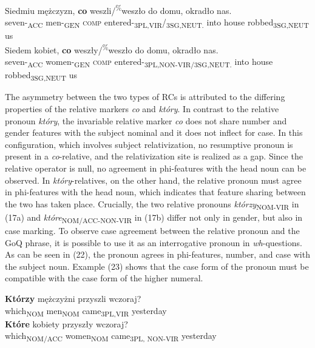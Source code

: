 \documentclass[output=paper]{langsci/langscibook}
\begin{document}
\ea%
    \label{ex:leska:21}
    \ea
    \gll Siedmiu   mężczyzn,   \textbf{co}   weszli/\textsuperscript{\%}weszło     do domu, okradło     nas.\\
         seven-\textsubscript{ACC}   men-\textsubscript{GEN}   \textsc{comp}   entered-\textsubscript{3PL,VIR}/\textsubscript{3SG,NEUT.} into         house   robbed\textsubscript{3SG,NEUT} us\\
    \ex
    \gll Siedem   kobiet,   \textbf{co}   weszły/\textsuperscript{\%}weszło   \textsubscript{} do   domu,   okradło     nas.      \\
         seven-\textsubscript{ACC}   women-\textsubscript{GEN}   \textsc{comp}   entered-\textsubscript{3PL,NON-VIR/3SG,NEUT.}    into   house     robbed\textsubscript{3SG,NEUT} us \\
    \z
\z    

The asymmetry between the two types of RCs is attributed to the differing properties of the relative markers \textit{co} and \textit{który}. In contrast to the relative pronoun \textit{który}, the invariable relative marker \textit{co} does not share number and gender features with the subject nominal and it does not inflect for case. In this configuration, which involves subject relativization, no resumptive pronoun is present in a \textit{co}{}-relative, and the relativization site is realized as a gap. Since the relative operator is null, no agreement in phi-features with the head noun can be observed. In \textit{który}{}-relatives, on the other hand, the relative pronoun must agree in phi-features with the head noun, which indicates that feature sharing between the two has taken place. Crucially, the two relative pronouns \textit{którzy}\textsubscript{NOM-VIR} in (17a) and \textit{które}\textsubscript{NOM/ACC-NON-VIR} in (17b) differ not only in gender, but also in case marking. To observe case agreement between the relative pronoun and the GoQ phrase, it is possible to use it as an interrogative pronoun in \textit{wh}{}-questions. As can be seen in (22), the pronoun agrees in phi-features, number, and case with the subject noun. Example (23) shows that the case form of the pronoun must be compatible with the case form of the higher numeral.

\ea%
    \label{ex:leska:22}
    \ea
    \gll \textbf{Którzy}   mężczyżni   przyszli   wczoraj?\\
        which\textsubscript{NOM}   men\textsubscript{NOM}  came\textsubscript{3PL,VIR} yesterday\\
    \ex
    \gll \textbf{Które}   kobiety   przyszły     wczoraj?\\
         which\textsubscript{NOM/ACC} women\textsubscript{NOM}   came\textsubscript{3PL, NON-VIR} yesterday\\
    \z
\z    
\end{document}
